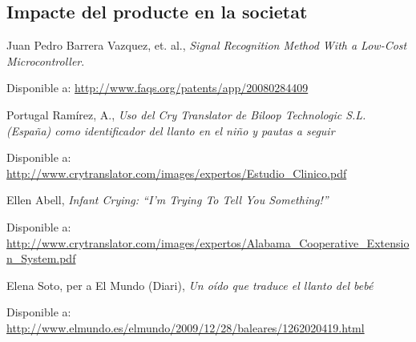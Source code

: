 \documentclass[11pt,a4paper]{article}
\begin{document}
\subsection{\textsf{Impacte del producte en la societat}}

\clearpage
\begin{thebibliography}{1}

 Juan Pedro Barrera Vazquez, et. al., \emph{Signal Recognition Method With a Low-Cost Microcontroller}. 

Disponible a: \url{http://www.faqs.org/patents/app/20080284409}

 Portugal Ramírez, A., \emph{Uso del Cry Translator de Biloop Technologic S.L. (España) como identificador del llanto en el niño y pautas a seguir }

Disponible a: \url{http://www.crytranslator.com/images/expertos/Estudio\_Clinico.pdf}

 Ellen Abell, \emph{Infant Crying: ``I’m Trying To Tell You Something!''}

Disponible a: \url{http://www.crytranslator.com/images/expertos/Alabama\_Cooperative\_Extension\_System.pdf}

 Elena Soto, per a El Mundo (Diari), \emph{Un oído que traduce el llanto del bebé}

Disponible a: \url{http://www.elmundo.es/elmundo/2009/12/28/baleares/1262020419.html}
\end{thebibliography}
\end{document}
